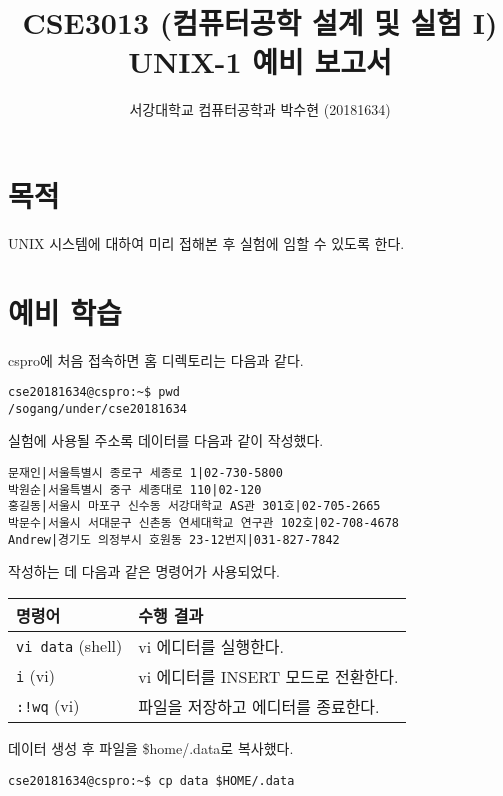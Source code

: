 
	


\title{CSE3013 (컴퓨터공학 설계 및 실험 I) \space \newline UNIX-1 예비 보고서}
\author{서강대학교 컴퓨터공학과 박수현 (20181634)}
\maketitle

\section{목적}
UNIX 시스템에 대하여 미리 접해본 후 실험에 임할 수 있도록 한다.

\section{예비 학습}
cspro에 처음 접속하면 홈 디렉토리는 다음과 같다.
\begin{verbatim}
cse20181634@cspro:~$ pwd
/sogang/under/cse20181634
\end{verbatim}

실험에 사용될 주소록 데이터를 다음과 같이 작성했다.
\begin{verbatim}
문재인|서울특별시 종로구 세종로 1|02-730-5800
박원순|서울특별시 중구 세종대로 110|02-120
홍길동|서울시 마포구 신수동 서강대학교 AS관 301호|02-705-2665
박문수|서울시 서대문구 신촌동 연세대학교 연구관 102호|02-708-4678
Andrew|경기도 의정부시 호원동 23-12번지|031-827-7842
\end{verbatim}

작성하는 데 다음과 같은 명령어가 사용되었다.

\begin{tabular}{l|l}
	명령어 & 수행 결과 \\
	\hline
	\texttt{vi data} (shell) & vi 에디터를 실행한다. \\
	\texttt{i} (vi) & vi 에디터를 INSERT 모드로 전환한다. \\
	\texttt{:!wq} (vi) & 파일을 저장하고 에디터를 종료한다.
\end{tabular}

데이터 생성 후 파일을 \$home/.data로 복사했다.

\begin{verbatim}
cse20181634@cspro:~$ cp data $HOME/.data
\end{verbatim}

